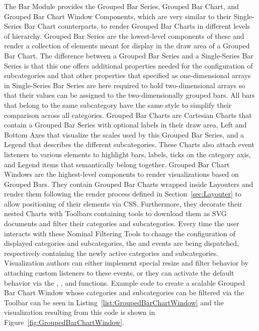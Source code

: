 The Bar Module provides the Grouped Bar Series, Grouped Bar Chart, and
Grouped Bar Chart Window Components, which are very similar to their
Single-Series Bar Chart counterparts, to render Grouped Bar Charts in
different levels of hierarchy.  Grouped Bar Series are the
lowest-level components of these and render a collection of
 elements meant for display in the draw area of a Grouped
Bar Chart.  The difference between a Grouped Bar Series and a
Single-Series Bar Series is that this one offers additional properties
needed for the configuration of subcategories and that other
properties that specified as one-dimensional arrays in Single-Series
Bar Series are here required to hold two-dimensional arrays so that
their values can be assigned to the two-dimensionally grouped bars.
All bars that belong to the same subcategory have the same style to
simplify their comparison across all categories.  Grouped Bar Charts
are Cartesian Charts that contain a Grouped Bar Series with optional
labels in their draw area, Left and Bottom Axes that visualize the
scales used by this Grouped Bar Series, and a Legend that describes
the different subcategories.  These Charts also attach event listeners
to various elements to highlight bars, labels, ticks on the category
axis, and Legend items that semantically belong together.  Grouped Bar
Chart Windows are the highest-level components to render
visualizations based on Grouped Bars.  They contain Grouped Bar Charts
wrapped inside Layouters and render them following the render process
defined in Section~\ref{sec:Layouter} to allow positioning of their
elements via CSS.  Furthermore, they decorate their nested Charts with
Toolbars containing tools to download them as SVG documents and filter
their categories and subcategories.  Every time the user interacts
with these Nominal Filtering Tools to change the configuration of
displayed categories and subcategories, the  and
 events are being dispatched, respectively
containing the newly active categories and subcategories.
Visualization authors can either implement special resize and filter
behavior by attaching custom listeners to these events, or they can
activate the default behavior via the
,
, and
 functions.
Example code to create a scalable Grouped Bar Chart Window whose
categories and subcategories can be filtered via the Toolbar can be
seen in Listing~\ref{list:GroupedBarChartWindow} and the visualization
resulting from this code is shown in
Figure~\ref{fig:GroupedBarChartWindow}.



